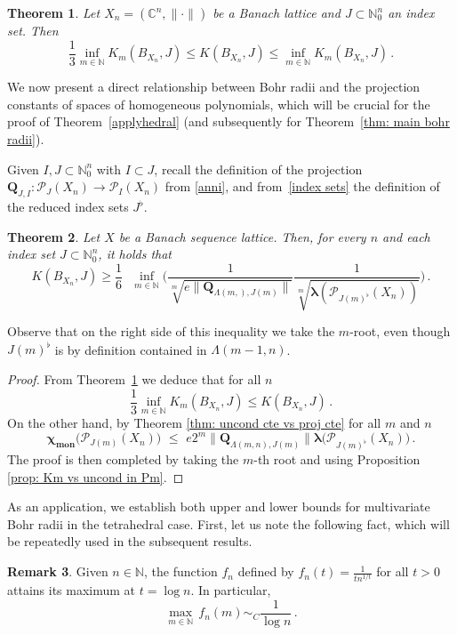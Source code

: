 \documentclass[12pt]{amsart}
\numberwithin{subsection}{section}
\newtheorem{theorem}{Theorem}[section]
\theoremstyle{definition}
\newtheorem{remark}[theorem]{Remark}
\theoremstyle{remark}
\newcommand{\dis}{\displaystyle}
\newcommand{\NN}{\mathbb N}
\newcommand{\CC}{\mathbb C}
\DeclareMathOperator{\mon}{mon}
\newcommand{\chimon}{\chi_{\mon}}
\begin{document}
\begin{theorem}\label{thm: Bohr vs unc}
Let ${X_n} = (\CC^n, \| \cdot \|)$ be a  Banach lattice and  $J \subset \NN_0^n$ an index set. Then
\[
\frac{1}{3} \inf_{ m \in \mathbb{N} } K_m(B_{X_n},J)  \le K(B_{X_n},J)  \le \inf_{m \in \mathbb{N}} K_m(B_{X_n},J)\,.
\]
\end{theorem}

We now present a direct relationship between Bohr radii and the projection constants of spaces of homogeneous polynomials,
which will be crucial for the proof of Theorem~\ref{applyhedral} (and subsequently for Theorem~\ref{thm: main bohr radii}).

Given $I,J \subset  \mathbb{N}_0^n$ with $I \subset J$, recall the definition of the projection
$
\mathbf{Q}_{J,I} \colon \mathcal{P}_J(X_n) \to \mathcal{P}_I(X_n)
$
from \eqref{anni}, and from~\eqref{index sets} the definition of the reduced index sets $J^\flat$.

\begin{theorem} \label{applyproj}
Let $X$ be a Banach sequence lattice. Then, for every $n$ and each  index set $J \subset \NN_0^n$, it holds that
\[
K(B_{X_n},J)   \ge  \frac{1}{6} \,\,\,\,\inf_{m \in \mathbb{N} }
\bigg( \frac{1}{\sqrt[m]{e\big\|\mathbf{Q}_{\Lambda(m,), J(m)}\big\|}}
\frac{1}{\sqrt[m]{\boldsymbol{\lambda}(\mathcal{P}_{J(m)^\flat}(X_n))}} \bigg)\,.
\]
\end{theorem}
Observe that on the right side of this inequality we take the $m$-root, even though $J(m)^\flat$ is by definition
contained in $\Lambda(m-1,n)$.


\begin{proof}
From Theorem~\ref{thm: Bohr vs unc} we deduce that for all $n$
\[
\frac{1}{3} \inf_{ m \in \mathbb{N} } K_m(B_{X_n},J)  \le K(B_{X_n},J)\,.
\]
On the other hand, by Theorem \ref{thm: uncond cte vs proj cte}  for all $m$ and $n$
\[
\boldsymbol{\chimon}\big( \mathcal{P}_{J(m)}(X_n) \big)\,\, \le\,\, e 2^{m}
\big\|\mathbf{Q}_{\Lambda(m,n),J(m)} \big\|\boldsymbol{\lambda}\big( \mathcal{P}_{J(m)^\flat}(X_n) \big)\,.
\]
The proof is then completed by taking the $m$-th root and using Proposition \ref{prop: Km vs uncond in Pm}.
\end{proof}


As an application, we establish both upper and lower bounds for multivariate Bohr radii in the tetrahedral case. First,
let us note the following fact, which will be repeatedly used in the subsequent results.


\begin{remark}\label{rem: maximum of f}
Given  $n \in \mathbb{N}$, the function $f_n$ defined by  $f_n(t) = \frac{1}{t n^{1/t}}$ for all $t > 0$ attains
its maximum at $t = \log n$. In particular,
\[
\dis \max_{m \in \mathbb{N}}\,f_n(m) \sim_C \frac{1}{\log n}\,.
\]
\end{remark}
\end{document}

